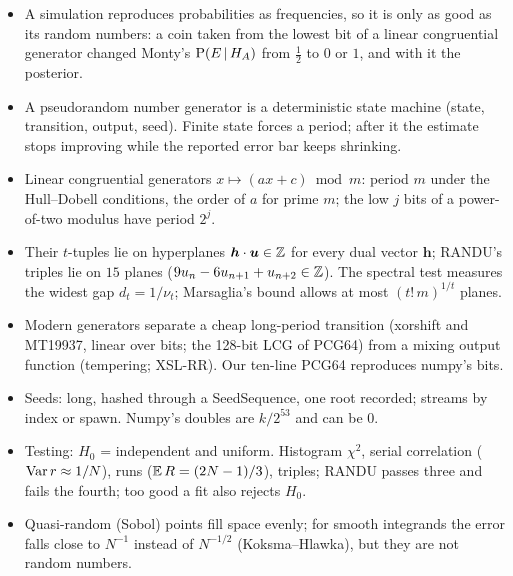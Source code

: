 \begin{recap}
\begin{itemize}[itemsep=1pt]
  \item A simulation reproduces probabilities as frequencies, so it is only as good
        as its random numbers: a coin taken from the lowest bit of a linear
        congruential generator changed Monty's $\operatorname{P}(E\,\vert\, H_A)$ from $\tfrac12$
        to $0$ or $1$, and with it the posterior.
  \item A pseudorandom number generator is a deterministic state machine (state,
        transition, output, seed). Finite state forces a period; after it the
        estimate stops improving while the reported error bar keeps shrinking.
  \item Linear congruential generators $x\mapsto(ax+c)\bmod m$: period $m$ under the
        Hull--Dobell conditions, the order of $a$ for prime $m$; the low $j$ bits of
        a power-of-two modulus have period $2^j$.
  \item Their $t$-tuples lie on hyperplanes $\bm h\cdot\bm u\in\Z$ for every dual
        vector $\bm h$; RANDU's triples lie on $15$ planes
        ($9u_n-6u_{n+1}+u_{n+2}\in\Z$). The spectral test measures the widest gap
        $d_t=1/\nu_t$; Marsaglia's bound allows at most $(t!\,m)^{1/t}$ planes.
  \item Modern generators separate a cheap long-period transition (xorshift and
        MT19937, linear over bits; the 128-bit LCG of PCG64) from a mixing output
        function (tempering; XSL-RR). Our ten-line PCG64 reproduces numpy's bits.
  \item Seeds: long, hashed through a SeedSequence, one root recorded; streams by
        index or spawn. Numpy's doubles are $k/2^{53}$ and can be $0$.
  \item Testing: $H_0$ = independent and uniform. Histogram $\chi^2$, serial
        correlation ($\operatorname{Var} r\approx1/N$), runs ($\E R=(2N-1)/3$), triples;
        RANDU passes three and fails the fourth; too good a fit also rejects $H_0$.
  \item Quasi-random (Sobol) points fill space evenly; for smooth integrands the
        error falls close to $N^{-1}$ instead of $N^{-1/2}$ (Koksma--Hlawka), but they
        are not random numbers.
\end{itemize}
\end{recap}
\providecommand{\SixBInvN}{}\renewcommand{\SixBInvN}{100000}
\providecommand{\SixBInvTmean}{}\renewcommand{\SixBInvTmean}{2.196}
\providecommand{\SixBInvTstd}{}\renewcommand{\SixBInvTstd}{2.203}
